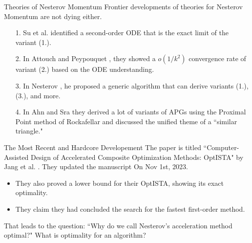 \documentclass[11pt]{beamer}
\theoremstyle{definition}
\begin{document}
    \begin{frame}{Theories of Nesterov Momentum}
        Frontier developments of theories for Nesterov Momentum are not dying either. 
        \begin{itemize}
            \item [1.] Su et al. \cite{su_differential_2015} identified a second-order ODE that is the exact limit of the variant (1.). 
            \item [2.] In Attouch and Peypouquet \cite{attouch_rate_2016}, they showed a $o(1/k^2)$ convergence rate of variant (2.) based on the ODE understanding. 
            \item [3.] In Nesterov \cite{nesterov_lecture_2018}, he proposed a generic algorithm that can derive variants (1.), (3.), and more. 
            \item [4.] In Ahn and Sra \cite{ahn_understanding_2022}
            they derived a lot of variants of APGs using the Proximal Point method of Rockafellar and discussed the unified theme of a ``similar triangle." 
        \end{itemize}
    \end{frame}
    \begin{frame}{The Most Recent and Hardcore Developement}
        The paper is titled ``Computer-Assisted Design of Accelerated Composite Optimization Methods: OptISTA" by Jang et al. \cite{jang_computer-assisted_2023}.
        They updated the manuscript On Nov 1st, 2023. 
        \begin{itemize}
            \item They also proved a lower bound for their OptISTA, showing its exact optimality. 
            \item They claim they had concluded the search for the fastest first-order method. 
        \end{itemize}
        That leads to the question: ``Why do we call Nesterov's acceleration method optimal?" 
        What is optimality for an algorithm? 
    \end{frame}
\end{document}
